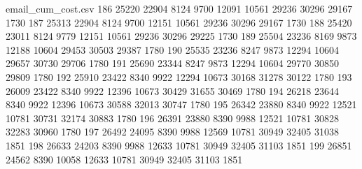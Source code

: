 \begin{filecontents*}{email_cum_cost.csv}
186	25220	22904	8124	9700	12091	10561	29236	30296	29167	1730
187	25313	22904	8124	9700	12151	10561	29236	30296	29167	1730
188	25420	23011	8124	9779	12151	10561	29236	30296	29225	1730
189	25504	23236	8169	9873	12188	10604	29453	30503	29387	1780
190	25535	23236	8247	9873	12294	10604	29657	30730	29706	1780
191	25690	23344	8247	9873	12294	10604	29770	30850	29809	1780
192	25910	23422	8340	9922	12294	10673	30168	31278	30122	1780
193	26009	23422	8340	9922	12396	10673	30429	31655	30469	1780
194	26218	23644	8340	9922	12396	10673	30588	32013	30747	1780
195	26342	23880	8340	9922	12521	10781	30731	32174	30883	1780
196	26391	23880	8390	9988	12521	10781	30828	32283	30960	1780
197	26492	24095	8390	9988	12569	10781	30949	32405	31038	1851
198	26633	24203	8390	9988	12633	10781	30949	32405	31103	1851
199	26851	24562	8390	10058	12633	10781	30949	32405	31103	1851

\end{filecontents*}
